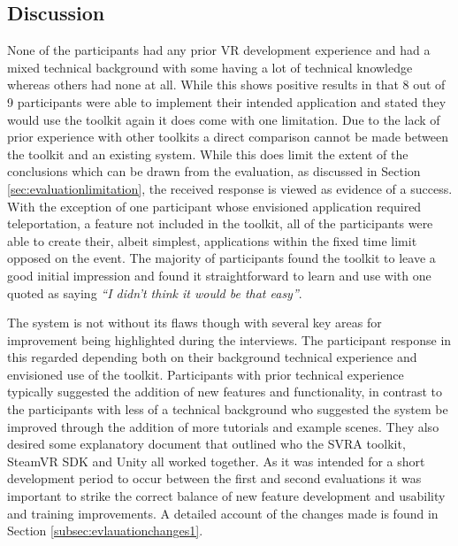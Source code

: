 \documentclass{l4proj}
\begin{document}
\subsection{Discussion}
\label{subsec:evlauationdiscuss1}
None of the participants had any prior VR development experience and had a mixed technical background with some having a lot of technical knowledge whereas others had none at all. While this shows positive results in that 8 out of 9 participants were able to implement their intended application and stated they would use the toolkit again it does come with one limitation. Due to the lack of prior experience with other toolkits a direct comparison cannot be made between the toolkit and an existing system. While this does limit the extent of the conclusions which can be drawn from the evaluation, as discussed in Section \ref{sec:evaluationlimitation}, the received response is viewed as evidence of a success. With the exception of one participant whose envisioned application required teleportation, a feature not included in the toolkit, all of the participants were able to create their, albeit simplest, applications within the fixed time limit opposed on the event. The majority of participants found the toolkit to leave a good initial impression and found it straightforward to learn and use with one quoted as saying \textit{``I didn’t think it would be that easy''}. 

The system is not without its flaws though with several key areas for improvement being highlighted during the interviews. The participant response in this regarded depending both on their background technical experience and envisioned use of the toolkit. Participants with prior technical experience typically suggested the addition of new features and functionality, in contrast to the participants with less of a technical background who suggested the system be improved through the addition of more tutorials and example scenes. They also desired some explanatory document that outlined who the SVRA toolkit, SteamVR SDK and Unity all worked together. As it was intended for a short development period to occur between the first and second evaluations it was important to strike the correct balance of new feature development and usability and training improvements. A detailed account of the changes made is found in Section \ref{subsec:evlauationchanges1}.
\end{document}
